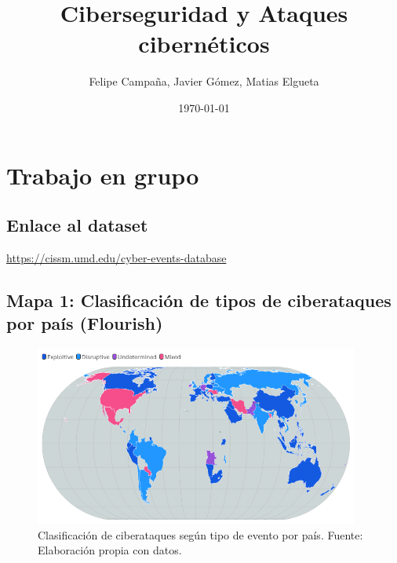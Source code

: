 \documentclass[12pt, a4paper]{article}
\title{Ciberseguridad y Ataques cibernéticos}
\author{Felipe Campaña, Javier Gómez, Matias Elgueta}
\date{\today\\[2cm]}
\begin{document}
\maketitle

\vspace*{0.3cm}
\begin{figure}[H]
    \centering
    \begin{minipage}[t]{0.45\linewidth}
    \end{minipage}
    \hfill
    \begin{minipage}[t]{0.45\linewidth}
    \end{minipage}
\end{figure}

\section*{Trabajo en grupo}

\subsection*{Enlace al dataset}
\url{https://cissm.umd.edu/cyber-events-database}

\vspace{1em}
\subsection*{Mapa 1: Clasificación de tipos de ciberataques por país (Flourish)}

\begin{figure}[H]
    \centering
    \includegraphics[width=0.95\textwidth]{images/punto_cate.png}
    \caption{Clasificación de ciberataques según tipo de evento por país. Fuente: Elaboración propia con datos.}
\end{figure}
\end{document}
